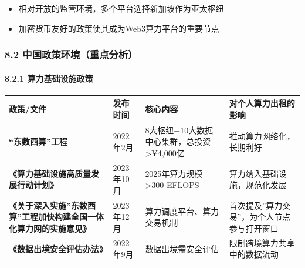 \documentclass[UTF8,a4paper,12pt]{ctexart}
\begin{document}
\begin{itemize}
\tightlist
\item
  相对开放的监管环境，多个平台选择新加坡作为亚太枢纽
\item
  加密货币友好的政策使其成为Web3算力平台的重要节点
\end{itemize}

\subsubsection{8.2
中国政策环境（重点分析）}\label{ux4e2dux56fdux653fux7b56ux73afux5883ux91cdux70b9ux5206ux6790}

\paragraph{8.2.1
算力基础设施政策}\label{ux7b97ux529bux57faux7840ux8bbeux65bdux653fux7b56}

{\def\LTcaptype{none} %
\begin{longtable}[]{@{}
  >{\raggedright\arraybackslash}p{}
  >{\raggedright\arraybackslash}p{}
  >{\raggedright\arraybackslash}p{}
  >{\raggedright\arraybackslash}p{}@{}}
\toprule\noalign{}
\begin{minipage}[b]{\linewidth}\raggedright
政策/文件
\end{minipage} & \begin{minipage}[b]{\linewidth}\raggedright
发布时间
\end{minipage} & \begin{minipage}[b]{\linewidth}\raggedright
核心内容
\end{minipage} & \begin{minipage}[b]{\linewidth}\raggedright
对个人算力出租的影响
\end{minipage} \\
\midrule\noalign{}
\endhead
\bottomrule\noalign{}
\endlastfoot
\textbf{``东数西算''工程} & 2022年2月 &
8大枢纽+10大数据中心集群，总投资\textgreater¥4,000亿 &
推动算力网络化，长期利好 \\
\textbf{《算力基础设施高质量发展行动计划》} & 2023年10月 &
2025年算力规模\textgreater300 EFLOPS & 算力纳入基础设施，规范化发展 \\
\textbf{《关于深入实施''东数西算''工程加快构建全国一体化算力网的实施意见》}
& 2023年12月 & 算力调度平台、算力交易机制 &
首次提及''算力交易''，为个人节点参与打开窗口 \\
\textbf{《数据出境安全评估办法》} & 2022年9月 & 数据出境需安全评估 &
限制跨境算力共享中的数据流动 \\
\end{longtable}
}
\end{document}
